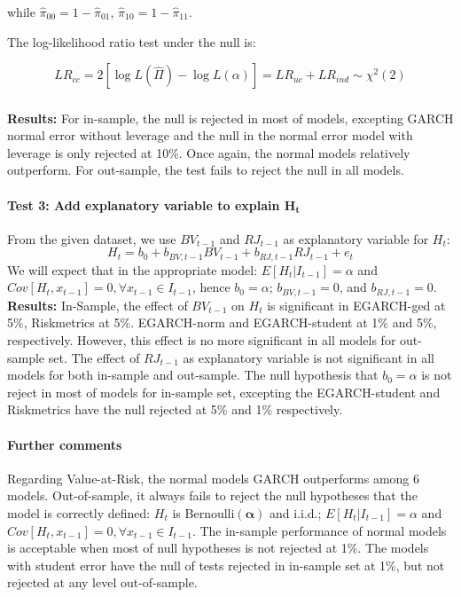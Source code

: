 \documentclass[a4paper]{article}
\begin{document}
while $\hat{\pi}_{00} = 1 - \hat{\pi}_{01}$, $\hat{\pi}_{10} = 1 - \hat{\pi}_{11}$.

The log-likelihood ratio test under the null is: 

\[LR_{cc} = 2[\log L(\hat{\Pi}) - \log L(\alpha)] = LR_{uc} + LR_{ind} \sim \chi^2(2) \]

\subparagraph*{}
\textbf{Results:} For in-sample, the null is rejected in most of models, excepting GARCH normal error without leverage and the null in the normal error model with leverage is only rejected at 10\%. Once again, the normal models relatively outperform. For out-sample, the test fails to reject the null in all models. 

\paragraph{Test 3: Add explanatory variable to explain $\mathbf{H_t}$}

From the given dataset, we use $BV_{t-1}$ and $RJ_{t-1}$ as explanatory variable for $H_t$:
\[H_t = b_0 + b_{BV,t-1} BV_{t-1} + b_{RJ,t-1} RJ_{t-1} + e_{t}\]
We will expect that in the appropriate model: $E[H_t | I_{t-1}] = \alpha$ and $Cov[H_t, x_{t-1}] = 0, \forall x_{t-1} \in I_{t-1}$, hence $b_0 = \alpha$; $b_{BV,t-1} = 0$, and $b_{RJ,t-1} = 0$. \\

\textbf{Results:} In-Sample, the effect of $BV_{t-1}$ on $H_t$ is significant in EGARCH-ged at 5\%, Riskmetrics at 5\%. EGARCH-norm and EGARCH-student at 1\% and 5\%, respectively. However, this effect is no more significant in all models for out-sample set. The effect of $RJ_{t-1}$ as explanatory variable is not significant in all models for both in-sample and out-sample. The null hypothesis that $b_0 = \alpha$ is not reject in most of models for in-sample set, excepting the EGARCH-student and Riskmetrics have the null rejected at 5\% and 1\% respectively. \\

\paragraph{Further comments}
Regarding Value-at-Risk, the normal models GARCH outperforms among 6 models. Out-of-sample, it always fails to reject the null hypotheses that the model is correctly defined: $H_t$ is Bernoulli$(\mathbf{\alpha})$ and i.i.d.; $E[H_t | I_{t-1}] = \alpha$ and $Cov[H_t, x_{t-1}] = 0, \forall x_{t-1} \in I_{t-1}$. The in-sample performance of normal models is acceptable when most of null hypotheses is not rejected at 1\%. The models with student error have the null of tests rejected in in-sample set at 1\%, but not rejected at any level out-of-sample. \\
\end{document}

